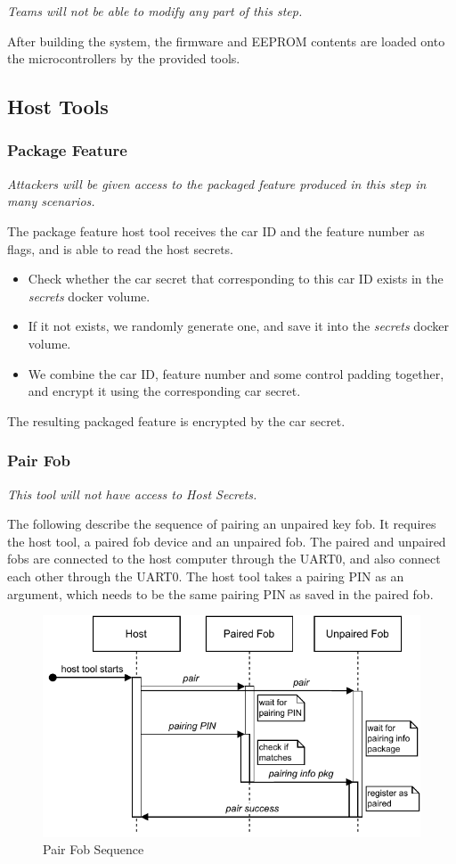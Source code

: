 \documentclass[11pt,oneside,onecolumn,letterpaper]{article}
\begin{document}
\textit{Teams will not be able to modify any part of this step.}

After building the system, the firmware and EEPROM contents are loaded onto the microcontrollers by the provided tools.

\subsection{Host Tools}

\subsubsection{Package Feature}

\textit{Attackers will be given access to the packaged feature produced in this step in many scenarios.}

The package feature host tool receives the car ID and the feature number as flags, and is able to read the host secrets.
\begin{itemize}
	\item Check whether the car secret that corresponding to this car ID exists in the \textit{secrets} docker volume.
	\item If it not exists, we randomly generate one, and save it into the \textit{secrets} docker volume.
	\item We combine the car ID, feature number and some control padding together, and encrypt it using the corresponding car secret.
\end{itemize}

The resulting packaged feature is encrypted by the car secret.

\subsubsection{Pair Fob}

\textit{This tool will not have access to Host Secrets.}

The following describe the sequence of pairing an unpaired key fob. It requires the host tool, a paired fob device and an unpaired fob. The paired and unpaired fobs are connected to the host computer through the UART0, and also connect each other through the UART0. The host tool takes a pairing PIN as an argument, which needs to be the same pairing PIN as saved in the paired fob.

\begin{figure}[!htbp]
	\begin{centering}
		\includegraphics[width = .6\textwidth]{pic/pair.pdf}
		\caption{Pair Fob Sequence}
		\label{fig:pair}
	\end{centering}
\end{figure}
\end{document}
